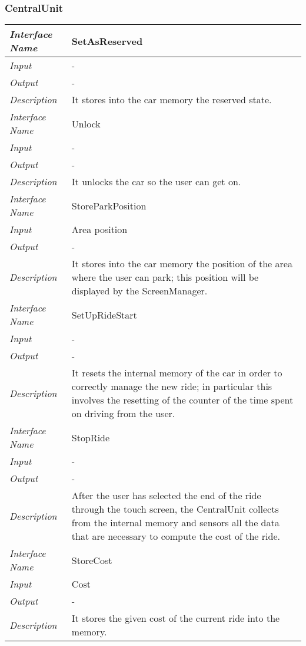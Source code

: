 \documentclass[11pt,a4paper]{report}
\begin{document}
\subsubsection{CentralUnit}
	\begin{tabularx}{\textwidth}{|>{\em}l|X|}
		\hline
		Interface Name& SetAsReserved\\
		\hline
		Input & -\\
		\hline
		Output & -\\
		\hline
		Description &It stores into the car memory the reserved state.\\
		\hline
		\hline
		Interface Name& Unlock\\
		\hline
		Input & -\\
		\hline
		Output & -\\
		\hline
		Description &It unlocks the car so the user can get on.\\
		\hline
		\hline
		Interface Name& StoreParkPosition\\
		\hline
		Input & Area position\\
		\hline
		Output & -\\
		\hline
		Description &It stores into the car memory the position of the area where the user can park; this position will be displayed by the ScreenManager.\\
		\hline
		\hline
		Interface Name& SetUpRideStart\\
		\hline
		Input & -\\
		\hline
		Output & -\\
		\hline
		Description &It resets the internal memory of the car in order to correctly manage the new ride; in particular this involves the resetting of the counter of the time spent on driving from the user.\\
		\hline
		\hline
		Interface Name& StopRide\\
		\hline
		Input & -\\
		\hline
		Output & -\\
		\hline
		Description &After the user has selected the end of the ride through the touch screen, the CentralUnit collects from the internal memory and sensors all the data that are necessary to compute the cost of the ride.\\
		\hline
		\hline
		Interface Name& StoreCost\\
		\hline
		Input & Cost\\
		\hline
		Output & -\\
		\hline
		Description &It stores the given cost of the current ride into the memory.\\

\end{tabularx}
\end{document}
